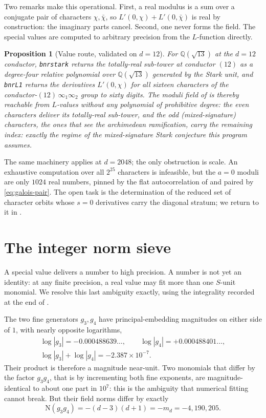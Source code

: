 \documentclass[12pt,a4paper]{article}
\newtheorem{proposition}[theorem]{Proposition}
\newcommand{\md}{m_d}
\newcommand{\Norm}{\mathrm{N}}
\begin{document}
Two remarks make this operational.  First, a real modulus is a sum over a
conjugate pair of characters $\chi,\bar\chi$, so
$L'(0,\chi)+L'(0,\bar\chi)$ is real by construction: the imaginary parts cancel.
Second, one never forms the field.  The special values are computed to arbitrary
precision from the $L$-function directly.

\begin{proposition}[Value route, validated on $d=12$]
\label{prop:portals-d12}
For $\mathbb{Q}(\sqrt{13})$ at the $d=12$ conductor, \texttt{bnrstark} returns
the totally-real sub-tower at conductor $(12)$ as a degree-four relative
polynomial over $\mathbb{Q}(\sqrt{13})$ generated by the Stark unit, and
\texttt{bnrL1} returns the derivatives $L'(0,\chi)$ for all sixteen characters
of the conductor-$(12)\,\infty_1\infty_2$ group to sixty digits.  The moduli
field of  is thereby reachable from $L$-values without any
polynomial of prohibitive degree: the even characters deliver its totally-real
sub-tower, and the odd (mixed-signature) characters, the ones that see the
archimedean ramification, carry the remaining index: exactly the regime of
the mixed-signature Stark conjecture this program assumes.
\end{proposition}

The same machinery applies at $d=2048$; the only obstruction is scale.  An
exhaustive computation over all $2^{25}$ characters is infeasible, but the $a=0$
moduli are only $1024$ real numbers, pinned by the flat autocorrelation of
 and paired by \eqref{eq:galois-pair}.  The open task is the
determination of the reduced set of character orbits whose $s=0$ derivatives
carry the diagonal stratum; we return to it in .

\section{The integer norm sieve}
\label{sec:sieve}

A special value delivers a number to high precision.  A number is not yet an
identity: at any finite precision, a real value may fit more than one $S$-unit
monomial.  We resolve this last ambiguity exactly, using the integrality
recorded at the end of .

The two fine generators $g_3,g_4$ have principal-embedding magnitudes on either
side of $1$, with nearly opposite logarithms,
\[
\begin{gathered}
\log|g_3| = -0.000488639\ldots,\qquad
\log|g_4| = +0.000488401\ldots,\\
\log|g_3|+\log|g_4| = -2.387\times 10^{-7}.
\end{gathered}
\]
Their product is therefore a magnitude near-unit.  Two monomials that differ by
the factor $g_3 g_4$, that is by incrementing both fine exponents, are
magnitude-identical to about one part in $10^{7}$: this is the ambiguity that
numerical fitting cannot break.  But their field norms differ by exactly
\[
\Norm(g_3 g_4) = -(d-3)(d+1) = -\md = -4{,}190{,}205 .
\]
\end{document}
